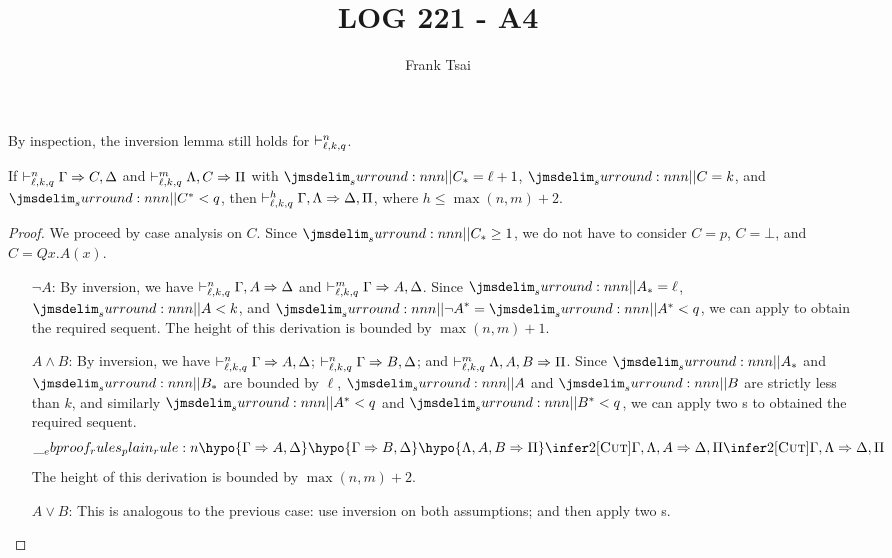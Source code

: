 \documentclass[a4paper]{article}
\title{LOG 221 - A4}
\author{Frank Tsai}
\begin{document}
\maketitle

By inspection, the inversion lemma still holds for $\mathrel{\vdash^{n}_{\ell,k,q}}$.
\begin{lemma}\label{0000}
  If $\mathrel{\vdash^{n}_{\ell,k,q}} \Gamma \Rightarrow C,\Delta$ and $\mathrel{\vdash^{m}_{\ell,k,q}} \Lambda,C \Rightarrow \Pi$ with $\dRank{C} = \ell + 1$, $\cRank{C} = k$, and $\qRank{C} < q$, then $\mathrel{\vdash^{h}_{\ell,k,q}} \Gamma,\Lambda \Rightarrow \Delta,\Pi$, where $h \leq \max(n,m) + 2$.
\end{lemma}
\begin{proof}
  We proceed by case analysis on $C$.
  Since $\dRank{C} \geq 1$, we do not have to consider $C = p$, $C = \bot$, and $C = Qx.A(x)$.
  \begin{itemize}
  \item[$\lnot A$:] By inversion, we have $\mathrel{\vdash^{n}_{\ell,k,q}} \Gamma,A \Rightarrow \Delta$ and $\mathrel{\vdash^{m}_{\ell,k,q}} \Gamma \Rightarrow A, \Delta$.
    Since $\dRank{A} = \ell$, $\cRank{A} < k$, and $\qRank{\lnot A} = \qRank{A} < q$, we can apply \rCut{} to obtain the required sequent.
    The height of this derivation is bounded by $\max(n,m) + 1$.
  \item[$A \wedge B$:] By inversion, we have $\mathrel{\vdash^{n}_{\ell,k,q}} \Gamma \Rightarrow A,\Delta$; $\mathrel{\vdash^{n}_{\ell,k,q}} \Gamma \Rightarrow B,\Delta$; and $\mathrel{\vdash^{m}_{\ell,k,q}} \Lambda,A,B \Rightarrow \Pi$.
    Since $\dRank{A}$ and $\dRank{B}$ are bounded by $\ell$, $\cRank{A}$ and $\cRank{B}$ are strictly less than $k$, and similarly $\qRank{A} < q$ and $\qRank{B} < q$, we can apply two \rCut{}s to obtained the required sequent.
    \[
      \ebrule{
        \hypo{\Gamma \Rightarrow A,\Delta}
        \hypo{\Gamma \Rightarrow B,\Delta}
        \hypo{\Lambda,A,B \Rightarrow \Pi}
        \infer2[\rCut]{\Gamma,\Lambda,A \Rightarrow \Delta,\Pi}
        \infer2[\rCut]{\Gamma,\Lambda \Rightarrow \Delta,\Pi}
      }
    \]
    The height of this derivation is bounded by $\max(n,m) + 2$.
  \item[$A \vee B$:] This is analogous to the previous case: use inversion on both assumptions; and then apply two \rCut{}s.
  \end{itemize}
\end{proof}

% 
% 
\end{document}
